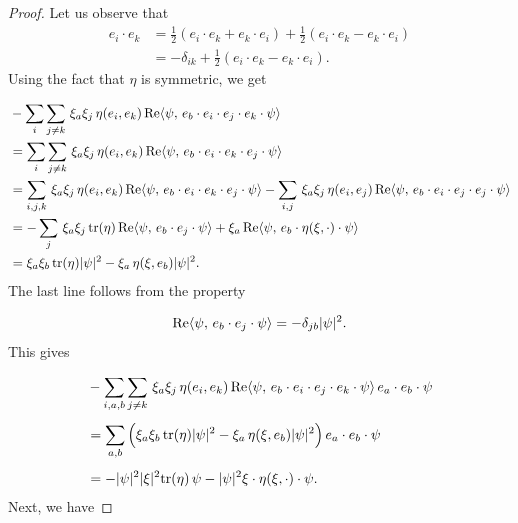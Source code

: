 \documentclass{amsart}
\theoremstyle{definition}
\theoremstyle{remark}
\numberwithin{equation}{section}
\newcommand{\tr}{\textup{tr}}
\begin{document}
\begin{proof}
	Let us observe that	
	\begin{align*}
		e_i\cdot e_k &= \frac{1}{2}(e_i\cdot e_k + e_k\cdot e_i) + \frac{1}{2}(e_i\cdot e_k - e_k\cdot e_i)\\
		&= -\delta_{ik} + \frac{1}{2}(e_i\cdot e_k - e_k\cdot e_i).
	\end{align*}
	Using the fact that $\eta$ is symmetric, we get
	
	\begin{align*}
		 &-\sum_{i}\sum_{j\neq k}\, \xi_a\xi_j\, \eta(e_i, e_k)\, \textup{Re}\langle \psi,\, e_b\cdot e_i\cdot e_j\cdot e_k\cdot\psi\rangle\\
		 &= \sum_{i}\sum_{j\neq k}\, \xi_a\xi_j\, \eta(e_i, e_k)\, \textup{Re}\langle \psi,\, e_b\cdot e_i\cdot e_k\cdot e_j\cdot\psi\rangle\\
		 &= \sum_{i,j,k}\, \xi_a\xi_j\, \eta(e_i, e_k)\, \textup{Re}\langle \psi,\, e_b\cdot e_i\cdot e_k\cdot e_j\cdot\psi\rangle - \sum_{i,j}\, \xi_a\xi_j\, \eta(e_i, e_j)\, \textup{Re}\langle \psi,\, e_b\cdot e_i\cdot e_j\cdot e_j\cdot\psi\rangle\\
		 &= -\sum_{j}\, \xi_a\xi_j\,\tr(\eta)\, \textup{Re}\langle \psi,\, e_b\cdot  e_j\cdot\psi\rangle + \xi_a \, \textup{Re}\langle \psi,\, e_b\cdot  \eta(\xi,\cdot)\cdot\psi\rangle\\
		 &= \xi_a\xi_b\,\tr(\eta)|\psi|^2 - \xi_a\,\eta(\xi, e_b) |\psi|^2.
	\end{align*}
	The last line follows from the property
	
		\[\textup{Re}\langle \psi,\, e_b\cdot  e_j\cdot\psi\rangle = -\delta_{jb}|\psi|^2.	\]
	This gives	
	
	\begin{equation}\label{eqn1;symbol_simplification}
		\begin{aligned}
			&-\sum_{i,a,b}\sum_{j\neq k}\, \xi_a\xi_j\, \eta(e_i, e_k)\, \textup{Re}\langle \psi,\, e_b\cdot e_i\cdot e_j\cdot e_k\cdot\psi\rangle \, e_a\cdot e_b\cdot \psi\\[1ex]
		&=\sum_{a, b} \Big(\xi_a\xi_b\,\tr(\eta)|\psi|^2 - \xi_a\,\eta(\xi, e_b) |\psi|^2\Big)\, e_a\cdot e_b\cdot\psi\\[1ex]
		&= -|\psi|^2|\xi|^2\tr(\eta)\,\psi - |\psi|^2\xi\cdot\eta(\xi,\cdot)\cdot\psi.		
		\end{aligned}
	\end{equation}
	Next, we have
	

\end{proof}
\end{document}
